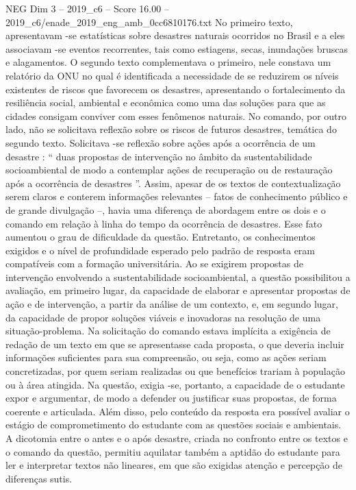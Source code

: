 \begin{textsample}{NEG Dim 3 – 2019\_c6 – Score 16.00 – 2019\_c6/enade\_2019\_eng\_amb\_0cc6810176.txt}
No primeiro texto, apresentavam -se estatísticas sobre desastres naturais ocorridos no Brasil e a eles associavam -se eventos recorrentes, tais como estiagens, secas, inundações bruscas e alagamentos.
O segundo texto complementava o primeiro, nele constava um relatório da ONU no qual é identificada a necessidade de se reduzirem os níveis existentes de riscos que favorecem os desastres, apresentando o fortalecimento da resiliência social, ambiental e econômica como uma das soluções para que as cidades consigam conviver com esses fenômenos naturais.
No comando, por outro lado, não se solicitava reflexão sobre os riscos de futuros desastres, temática do segundo texto.
Solicitava -se reflexão sobre ações após a ocorrência de um desastre : “ duas propostas de intervenção no âmbito da sustentabilidade socioambiental de modo a contemplar ações de recuperação ou de restauração após a ocorrência de desastres ”.
Assim, apesar de os textos de contextualização serem claros e conterem informações relevantes – fatos de conhecimento público e de grande divulgação –, havia uma diferença de abordagem entre os dois e o comando em relação à linha do tempo da ocorrência de desastres.
Esse fato aumentou o grau de dificuldade da questão.
Entretanto, os conhecimentos exigidos e o nível de profundidade esperado pelo padrão de resposta eram compatíveis com a formação universitária.
Ao se exigirem propostas de intervenção envolvendo a sustentabilidade socioambiental, a questão possibilitou a avaliação, em primeiro lugar, da capacidade de elaborar e apresentar propostas de ação e de intervenção, a partir da análise de um contexto, e, em segundo lugar, da capacidade de propor soluções viáveis e inovadoras na resolução de uma situação-problema.
Na solicitação do comando estava implícita a exigência de redação de um texto em que se apresentasse cada proposta, o que deveria incluir informações suficientes para sua compreensão, ou seja, como as ações seriam concretizadas, por quem seriam realizadas ou que benefícios trariam à população ou à área atingida.
Na questão, exigia -se, portanto, a capacidade de o estudante expor e argumentar, de modo a defender ou justificar suas propostas, de forma coerente e articulada.
Além disso, pelo conteúdo da resposta era possível avaliar o estágio de comprometimento do estudante com as questões sociais e ambientais.
A dicotomia entre o antes e o após desastre, criada no confronto entre os textos e o comando da questão, permitiu aquilatar também a aptidão do estudante para ler e interpretar textos não lineares, em que são exigidas atenção e percepção de diferenças sutis.

\end{textsample}

